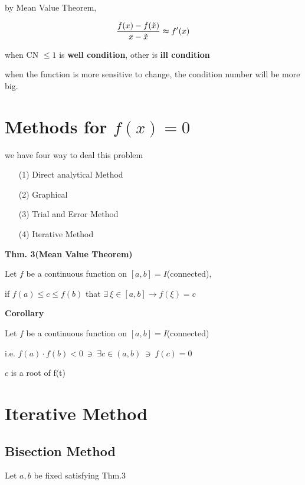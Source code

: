 by Mean Value Theorem,

$$\dfrac{f(x)-f(\tilde{x})}{x-\tilde{x}} \thickapprox f'(x)$$

when CN $\leq 1$ is \textbf{well condition}, other is \textbf{ill condition}

when the function is more sensitive to change, the condition number will be more big.

\newpage

\section{Methods for $f(x)=0$}

we have four way to deal this problem

\begin{enumerate}
	\item[(1)] Direct analytical Method
	\item[(2)] Graphical
	\item[(3)] Trial and Error Method
	\item[(4)] Iterative Method
\end{enumerate}

\textbf{Thm. 3(Mean Value Theorem)}

\begin{tcolorbox}
	Let $f$ be a continuous function on $[a,b] = I$(connected),
	
	if $f(a) \leq c \leq f(b)$ that $\exists~\xi \in [a,b] \rightarrow f(\xi) = c$
\end{tcolorbox}

\textbf{Corollary}


\begin{tcolorbox}
	Let $f$ be a continuous function on $[a,b] = I$(connected)
	
	i.e. $f(a) \cdot f(b) < 0 ~\ni~ \exists c \in (a,b) ~\ni~ f(c) = 0$
	
	$c$ is a root of f(t)
\end{tcolorbox}

\section*{Iterative Method}
\subsection{Bisection Method}$ $\\

Let $a,b$ be fixed satisfying Thm.3

